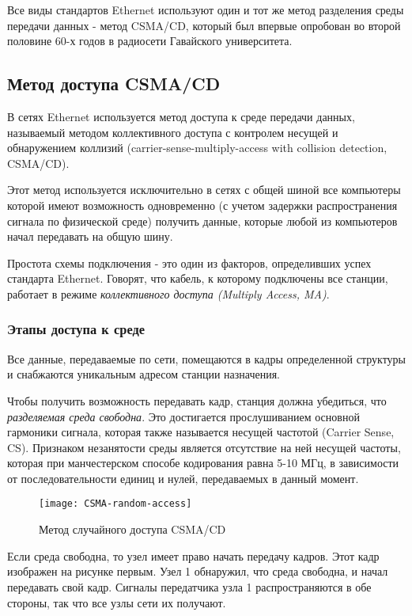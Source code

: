 Все виды стандартов Ethernet используют один и тот же метод разделения среды передачи данных - метод CSMA/CD, который был впервые опробован во второй половине 60-х годов в радиосети Гавайского университета.

\subsection{Метод доступа CSMA/CD}
В сетях Ethernet используется метод доступа к среде передачи данных, называемый методом коллективного доступа с контролем несущей и обнаружением коллизий (carrier-sense-multiply-access with collision detection, CSMA/CD).

Этот метод используется исключительно в сетях с общей шиной все компьютеры которой имеют возможность одновременно (с учетом задержки распространения сигнала по физической среде) получить данные, которые любой из компьютеров начал передавать на общую шину.

Простота схемы подключения - это один из факторов, определивших успех стандарта Ethernet.
Говорят, что кабель, к которому подключены все станции, работает в режиме \emph{коллективного доступа (Multiply Access, MA)}.

\subsubsection{Этапы доступа к среде}
Все данные, передаваемые по сети, помещаются в кадры определенной структуры и снабжаются уникальным адресом станции назначения.

Чтобы получить возможность передавать кадр, станция должна убедиться, что \emph{разделяемая среда свободна}.
Это достигается прослушиванием основной гармоники сигнала, которая также называется несущей частотой (Carrier Sense, CS).
Признаком незанятости среды является отсутствие на ней несущей частоты, которая при манчестерском способе кодирования равна 5-10 МГц, в зависимости от последовательности единиц и нулей, передаваемых в данный момент.

\begin{figure}
    \centering
    \texttt{[image: CSMA-random-access]}
    \caption{Метод случайного доступа CSMA/CD}
    \label{fig:CSMA-random-access}
\end{figure}

Если среда свободна, то узел имеет право начать передачу кадров.
Этот кадр изображен на рисунке первым.
Узел 1 обнаружил, что среда свободна, и начал передавать свой кадр.
Сигналы передатчика узла 1 распространяются в обе стороны, так что все узлы сети их получают.

